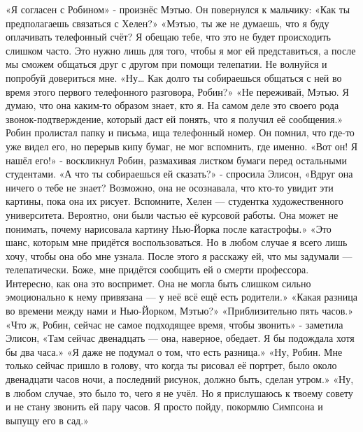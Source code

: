 \documentclass[a4paper,12pt]{book}
\begin{document}
	«Я согласен с Робином» - произнёс Мэтью. Он повернулся к мальчику:
	«Как ты предполагаешь связаться с Хелен?»
	«Мэтью, ты же не думаешь, что я буду оплачивать телефонный счёт? Я обещаю тебе, что это не будет происходить слишком часто. Это нужно лишь для того, чтобы я мог ей представиться, а после мы сможем общаться друг с другом при помощи телепатии. Не волнуйся и попробуй довериться мне.
	«Ну… Как долго ты собираешься общаться с ней во время этого первого телефонного разговора, Робин?»
	«Не переживай, Мэтью. Я думаю, что она каким-то образом знает, кто я. На самом деле это своего рода звонок-подтверждение, который даст ей понять, что я получил её сообщения.»
	Робин пролистал папку и письма, ища телефонный номер. Он помнил, что где-то уже видел его, но перерыв кипу бумаг, не мог вспомнить, где именно.
	«Вот он! Я нашёл его!» - воскликнул Робин, размахивая листком бумаги перед остальными студентами.
	«А что ты собираешься ей сказать?» - спросила Элисон,
	«Вдруг она ничего о тебе не знает? Возможно, она не осознавала, что кто-то увидит эти картины, пока она их рисует. Вспомните, Хелен — студентка художественного университета. Вероятно, они были частью её курсовой работы. Она может не понимать, почему нарисовала картину Нью-Йорка после катастрофы.»
	«Это шанс, которым мне придётся воспользоваться. Но в любом случае я всего лишь хочу, чтобы она обо мне узнала. После этого я расскажу ей, что мы задумали — телепатически. Боже, мне придётся сообщить ей о смерти профессора. Интересно, как она это воспримет. Она не могла быть слишком сильно эмоционально к нему привязана — у неё всё ещё есть родители.»
	«Какая разница во времени между нами и Нью-Йорком, Мэтью?»
	«Приблизительно пять часов.»
	«Что ж, Робин, сейчас не самое подходящее время, чтобы звонить» - заметила Элисон,
	«Там сейчас двенадцать — она, наверное, обедает. Я бы подождала хотя бы два часа.»
	«Я даже не подумал о том, что есть разница.»
	«Ну, Робин. Мне только сейчас пришло в голову, что когда ты рисовал её портрет, было около двенадцати часов ночи, а последний рисунок, должно быть, сделан утром.»
	«Ну, в любом случае, это было то, чего я не учёл. Но я прислушаюсь к твоему совету и не стану звонить ей пару часов. Я просто пойду, покормлю Симпсона и выпущу его в сад.»
	
\end{document}
